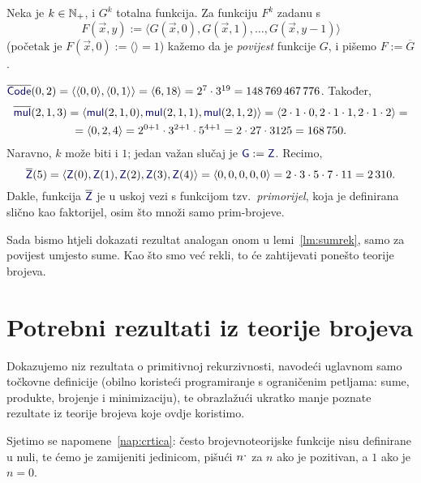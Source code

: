 \begin{definicija}
Neka je $k\in{\mathbb N}_+$, i $G^k$ totalna funkcija. Za funkciju $F^k$ zadanu s
\begin{equation}\label{eq:povijest}
    F(\vec x,y):=\langle G(\vec x,0),G(\vec x,1),\dotsc,G(\vec x,y-1)\rangle
\end{equation}
(početak je $F(\vec x,0):=\langle\rangle=1$) kažemo da je \emph{povijest} funkcije $G$, i pišemo $F:=\overline G$.
\end{definicija}

\begin{primjer}\label{pr:primorijel}
$\overline{\f{Code}}(0,2)=\kr{\kr{0,0},\kr{0,1}}=\kr{6,18}=2^7\cdot3^{19}=148\,769\,467\,776$. Također,
\begin{multline}
    \overline{\f{mul}}(2,1,3)=\langle\f{mul}(2,1,0),\f{mul}(2,1,1),\f{mul}(2,1,2)\rangle=\langle2\cdot1\cdot0,2\cdot1\cdot1,2\cdot1\cdot2\rangle=\\
    =\langle0,2,4\rangle=2^{0+1}\cdot3^{2+1}\cdot5^{4+1}=2\cdot27\cdot3125=168\,750.
\end{multline}
Naravno, $k$ može biti i $1$; jedan važan slučaj je $\f G:=\f Z$. Recimo,
\begin{equation}
    \overline{\f Z}(5)=\langle\f Z(0),\f Z(1),\f Z(2),\f Z(3),\f Z(4)\rangle=\langle0,0,0,0,0\rangle=2\cdot3\cdot5\cdot7\cdot11=2\,310.
\end{equation}
Dakle, funkcija $\overline{\f Z}$ je u uskoj vezi s funkcijom tzv.\ \emph{primorijel}, koja je definirana slično kao faktorijel, osim što množi samo prim-brojeve. 
\end{primjer}

Sada bismo htjeli dokazati rezultat analogan onom u lemi~\ref{lm:sumrek}, samo za povijest umjesto sume. Kao što smo već rekli, to će zahtijevati ponešto teorije brojeva.

\section{Potrebni rezultati iz teorije brojeva}\label{sec:teobroj}

Dokazujemo niz rezultata o primitivnoj rekurzivnosti, navodeći uglavnom samo toč\-kov\-ne definicije (obilno koristeći programiranje s ograničenim petljama: sume, produkte, brojenje i minimizaciju), te obrazlažući ukratko manje poznate rezultate iz teorije brojeva koje ovdje koristimo.

Sjetimo se napomene~\ref{nap:crtica}: često brojevnoteorijske funkcije nisu definirane u nuli, te ćemo je zamijeniti jedinicom, pišući $n\sp{\text{\normalsize.}}$ za $n$ ako je pozitivan, a $1$ ako je $n=0$.

